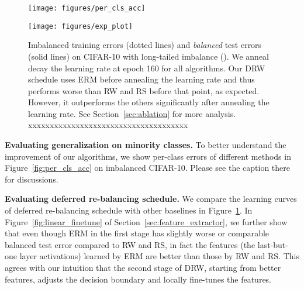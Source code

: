 \documentclass{article}
\newcommand{\tstagew}{DRW}
\begin{document}
\begin{figure}
\begin{minipage}[b]{0.48\linewidth}
\centering
\texttt{[image: figures/per\_cls\_acc]}
\caption{Per-class top-1 error on CIFAR-10 with step imbalance (). Classes 0-F to 4-F are frequent classes, and the rest are minority classes. Under this extremely imbalanced setting RW suffers from under-fitting, while RS over-fits on minority examples. On the contrary, the proposed algorithm exhibits great generalization on minority classes while keeping the performance on frequent classes almost unaffected. This suggests we succeeded in regularizing minority classes more strongly.}
\label{fig:per_cls_acc}
\end{minipage}
\hspace{0.5cm}
\begin{minipage}[b]{0.48\linewidth}
\centering
\texttt{[image: figures/exp\_plot]}
\caption{Imbalanced training errors (dotted lines) and \textit{balanced} test errors (solid lines) on CIFAR-10 with long-tailed imbalance (). We anneal decay the learning rate at epoch 160 for all algorithms. Our \tstagew{} schedule uses ERM before annealing the learning rate and thus performs worse than RW and RS before that point, as expected. However, it outperforms the others significantly after annealing the learning rate. See Section~\ref{sec:ablation} for more analysis. {\color{white} xxxxxxxxxxxxxxxxxxxxxxxxxxxxxxxxxxxxx}}
\label{fig:exp_plot}
\end{minipage}
\end{figure}

\textbf{Evaluating generalization on minority classes.} To better understand the improvement of our algorithms, we show per-class errors of different methods in Figure~\ref{fig:per_cls_acc} on imbalanced CIFAR-10. Please see the caption there for discussions.

\textbf{Evaluating deferred re-balancing schedule.} We compare the learning curves of deferred re-balancing schedule with other baselines in Figure~\ref{fig:exp_plot}. In Figure~\ref{fig:linear_finetune} of Section~\ref{sec:feature_extractor}, we further show that even though ERM in the first stage has slightly worse or comparable balanced test error compared to RW and RS, in fact the features (the last-but-one layer activations) learned by ERM are better than those by RW and RS. This agrees with our intuition that the second stage of \tstagew{}, starting from better features, adjusts the decision boundary and locally fine-tunes the features.
\end{document}
